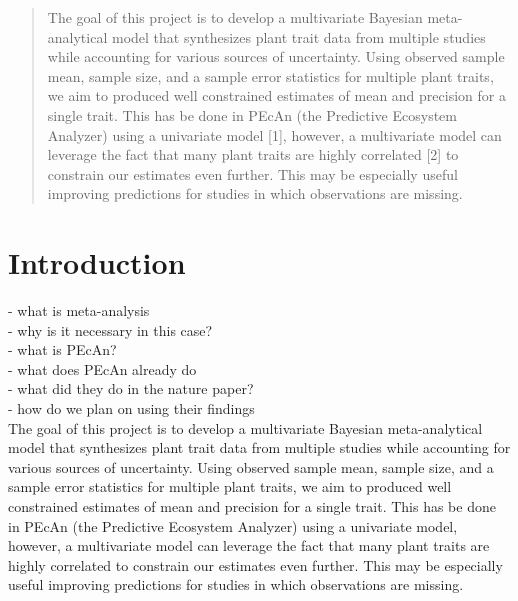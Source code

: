 \documentclass[12pt,fleqn]{article}
\theoremstyle{definition}
\theoremstyle{remark}
\theoremstyle{definition}
\begin{document}
\begin{singlespace}
\author{Betsy Cowdery}
\title{}
\date{December 12, 2014}

\maketitle


\begin{abstract}
The  goal of this project is to develop a multivariate Bayesian meta-analytical model that synthesizes plant trait data from multiple studies while accounting for various sources of uncertainty. Using observed sample mean, sample size, and a sample error statistics for multiple plant traits, we aim to produced well constrained estimates of mean and precision for a single trait. This has be done in PEcAn (the Predictive Ecosystem Analyzer) using a univariate model [1], however, a multivariate model can leverage the fact that many plant traits are highly correlated [2] to constrain our estimates even further. This may be especially useful improving predictions for studies in which observations are missing. 

\end{abstract}
\end{singlespace}


\section{Introduction}
 

 - what is meta-analysis\\
 - why is it necessary in this case?\\
 
 - what is PEcAn?\\
 - what does PEcAn already do\\
 
 - what did they do in the nature paper?\\
 - how do we plan on using their findings\\
 
 
 
The  goal of this project is to develop a multivariate Bayesian meta-analytical model that synthesizes plant trait data from multiple studies while accounting for various sources of uncertainty. Using observed sample mean, sample size, and a sample error statistics for multiple plant traits, we aim to produced well constrained estimates of mean and precision for a single trait. This has be done in PEcAn (the Predictive Ecosystem Analyzer) using a univariate model, however, a multivariate model can leverage the fact that many plant traits are highly correlated to constrain our estimates even further. This may be especially useful improving predictions for studies in which observations are missing. 
\end{document}
